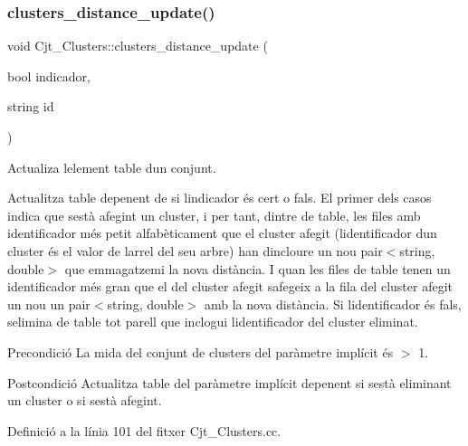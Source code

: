 \subsubsection{\texorpdfstring{clusters\+\_\+distance\+\_\+update()}{clusters\_distance\_update()}}
{\footnotesize\ttfamily void Cjt\+\_\+\+Clusters\+::clusters\+\_\+distance\+\_\+update (\begin{DoxyParamCaption}\item[{bool}]{indicador,  }\item[{string}]{id }\end{DoxyParamCaption})}



Actualiza l\textquotesingle{}element table d\textquotesingle{}un conjunt. 

Actualitza table depenent de si l\textquotesingle{}indicador és cert o fals. El primer dels casos indica que s\textquotesingle{}està afegint un cluster, i per tant, dintre de table, les files amb identificador més petit alfabèticament que el cluster afegit (l\textquotesingle{}identificador d\textquotesingle{}un cluster és el valor de l\textquotesingle{}arrel del seu arbre) han d\textquotesingle{}incloure un nou pair$<$string, double$>$ que emmagatzemi la nova distància. I quan les files de table tenen un identificador més gran que el del cluster afegit s\textquotesingle{}afegeix a la fila del cluster afegit un nou un pair$<$string, double$>$ amb la nova distància. Si l\textquotesingle{}identificador és fals, s\textquotesingle{}elimina de table tot parell que inclogui l\textquotesingle{}identificador del cluster eliminat.

\begin{DoxyPrecond}{Precondició}
La mida del conjunt de clusters del paràmetre implícit és $>$ 1. 
\end{DoxyPrecond}
\begin{DoxyPostcond}{Postcondició}
Actualitza table del paràmetre implícit depenent si s\textquotesingle{}està eliminant un cluster o si s\textquotesingle{}està afegint. 
\end{DoxyPostcond}


Definició a la línia 101 del fitxer Cjt\+\_\+\+Clusters.\+cc.



